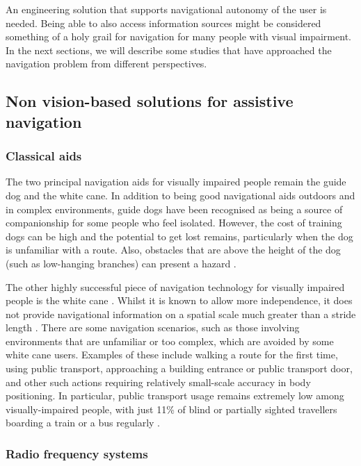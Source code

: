 An engineering solution that supports navigational autonomy of the user is needed. Being able to also access information sources might be considered something of a holy grail for navigation for many people with visual impairment. In the next sections, we will describe some studies that have approached the navigation problem from different perspectives.

\subsection{Non vision-based solutions for assistive navigation}

\subsubsection{Classical aids}

The two principal navigation aids for visually impaired people remain the guide dog and the white cane.  In addition to being good navigational aids outdoors and in complex environments, guide dogs have been recognised as being a source of companionship for some people who feel isolated. However, the cost of training dogs can be high and the potential to get lost remains, particularly when the dog is unfamiliar with a route. Also, obstacles that are above the height of the dog (such as low-hanging branches) can present a hazard \citep{manduchi2011mobility}. 

The other highly successful piece of navigation technology for visually impaired people is the white cane \citep{roentgen2008inventory}.  Whilst it is known to allow more independence, it does not provide  navigational information on a spatial scale much greater than a stride length \citep{maidenbaum2013increasing}. There are some navigation scenarios, such as those involving environments that are unfamiliar or too complex, which are avoided by some white cane users. Examples of these include walking a route for the first time, using public transport, approaching a building entrance or public transport door, and other such actions requiring relatively small-scale accuracy in body positioning. In particular, public transport usage remains extremely low among visually-impaired people, with just 11\% of blind or partially sighted travellers boarding a train or a bus regularly \citep{Pey2006}.

\subsubsection{Radio frequency systems}


